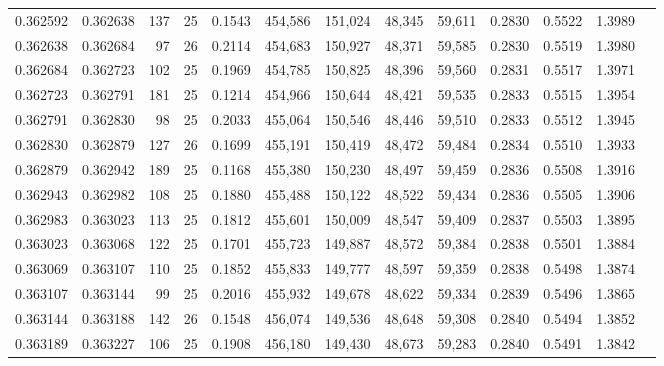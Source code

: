 \begin{tabular}{rrrrrrrrrrrrr}
0.362592 & 0.362638 &   137 &  25 &                                     0.1543 & 454,586 & 151,024 &  48,345 &  59,611 & 0.2830 & 0.5522 & 1.3989 \\
0.362638 & 0.362684 &    97 &  26 &                                     0.2114 & 454,683 & 150,927 &  48,371 &  59,585 & 0.2830 & 0.5519 & 1.3980 \\
0.362684 & 0.362723 &   102 &  25 &                                     0.1969 & 454,785 & 150,825 &  48,396 &  59,560 & 0.2831 & 0.5517 & 1.3971 \\
0.362723 & 0.362791 &   181 &  25 &                                     0.1214 & 454,966 & 150,644 &  48,421 &  59,535 & 0.2833 & 0.5515 & 1.3954 \\
0.362791 & 0.362830 &    98 &  25 &                                     0.2033 & 455,064 & 150,546 &  48,446 &  59,510 & 0.2833 & 0.5512 & 1.3945 \\
0.362830 & 0.362879 &   127 &  26 &                                     0.1699 & 455,191 & 150,419 &  48,472 &  59,484 & 0.2834 & 0.5510 & 1.3933 \\
0.362879 & 0.362942 &   189 &  25 &                                     0.1168 & 455,380 & 150,230 &  48,497 &  59,459 & 0.2836 & 0.5508 & 1.3916 \\
0.362943 & 0.362982 &   108 &  25 &                                     0.1880 & 455,488 & 150,122 &  48,522 &  59,434 & 0.2836 & 0.5505 & 1.3906 \\
0.362983 & 0.363023 &   113 &  25 &                                     0.1812 & 455,601 & 150,009 &  48,547 &  59,409 & 0.2837 & 0.5503 & 1.3895 \\
0.363023 & 0.363068 &   122 &  25 &                                     0.1701 & 455,723 & 149,887 &  48,572 &  59,384 & 0.2838 & 0.5501 & 1.3884 \\
0.363069 & 0.363107 &   110 &  25 &                                     0.1852 & 455,833 & 149,777 &  48,597 &  59,359 & 0.2838 & 0.5498 & 1.3874 \\
0.363107 & 0.363144 &    99 &  25 &                                     0.2016 & 455,932 & 149,678 &  48,622 &  59,334 & 0.2839 & 0.5496 & 1.3865 \\
0.363144 & 0.363188 &   142 &  26 &                                     0.1548 & 456,074 & 149,536 &  48,648 &  59,308 & 0.2840 & 0.5494 & 1.3852 \\
0.363189 & 0.363227 &   106 &  25 &                                     0.1908 & 456,180 & 149,430 &  48,673 &  59,283 & 0.2840 & 0.5491 & 1.3842 \\

\end{tabular}
